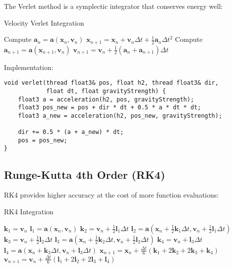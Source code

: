 \documentclass[12pt,a4paper]{article}
\theoremstyle{definition}
\theoremstyle{remark}
\begin{document}
The Verlet method is a symplectic integrator that conserves energy well:

\begin{algorithm}
\caption{Velocity Verlet Integration}
\begin{algorithmic}
\STATE Compute $\mathbf{a}_n = \mathbf{a}(\mathbf{x}_n, \mathbf{v}_n)$
\STATE $\mathbf{x}_{n+1} = \mathbf{x}_n + \mathbf{v}_n \Delta t + \frac{1}{2}\mathbf{a}_n \Delta t^2$
\STATE Compute $\mathbf{a}_{n+1} = \mathbf{a}(\mathbf{x}_{n+1}, \mathbf{v}_n)$
\STATE $\mathbf{v}_{n+1} = \mathbf{v}_n + \frac{1}{2}(\mathbf{a}_n + \mathbf{a}_{n+1})\Delta t$
\end{algorithmic}
\end{algorithm}

Implementation:

\begin{lstlisting}[style=metalstyle, caption=Verlet integration in Metal]
void verlet(thread float3& pos, float h2, thread float3& dir, 
            float dt, float gravityStrength) {
    float3 a = acceleration(h2, pos, gravityStrength);
    float3 pos_new = pos + dir * dt + 0.5 * a * dt * dt;
    float3 a_new = acceleration(h2, pos_new, gravityStrength);
    
    dir += 0.5 * (a + a_new) * dt;
    pos = pos_new;
}
\end{lstlisting}

\subsection{Runge-Kutta 4th Order (RK4)}

RK4 provides higher accuracy at the cost of more function evaluations:

\begin{algorithm}
\caption{RK4 Integration}
\begin{algorithmic}
\STATE $\mathbf{k}_1 = \mathbf{v}_n$
\STATE $\mathbf{l}_1 = \mathbf{a}(\mathbf{x}_n, \mathbf{v}_n)$
\STATE $\mathbf{k}_2 = \mathbf{v}_n + \frac{1}{2}\mathbf{l}_1 \Delta t$
\STATE $\mathbf{l}_2 = \mathbf{a}(\mathbf{x}_n + \frac{1}{2}\mathbf{k}_1 \Delta t, \mathbf{v}_n + \frac{1}{2}\mathbf{l}_1 \Delta t)$
\STATE $\mathbf{k}_3 = \mathbf{v}_n + \frac{1}{2}\mathbf{l}_2 \Delta t$
\STATE $\mathbf{l}_3 = \mathbf{a}(\mathbf{x}_n + \frac{1}{2}\mathbf{k}_2 \Delta t, \mathbf{v}_n + \frac{1}{2}\mathbf{l}_2 \Delta t)$
\STATE $\mathbf{k}_4 = \mathbf{v}_n + \mathbf{l}_3 \Delta t$
\STATE $\mathbf{l}_4 = \mathbf{a}(\mathbf{x}_n + \mathbf{k}_3 \Delta t, \mathbf{v}_n + \mathbf{l}_3 \Delta t)$
\STATE $\mathbf{x}_{n+1} = \mathbf{x}_n + \frac{\Delta t}{6}(\mathbf{k}_1 + 2\mathbf{k}_2 + 2\mathbf{k}_3 + \mathbf{k}_4)$
\STATE $\mathbf{v}_{n+1} = \mathbf{v}_n + \frac{\Delta t}{6}(\mathbf{l}_1 + 2\mathbf{l}_2 + 2\mathbf{l}_3 + \mathbf{l}_4)$
\end{algorithmic}
\end{algorithm}
\end{document}
